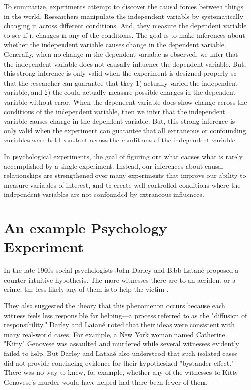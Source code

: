 To summarize, experiments attempt to discover the causal forces between things in the world. Researchers manipulate the independent variable by systematically changing it across different conditions. And, they measure the dependent variable to see if it changes in any of the conditions. The goal is to make inferences about whether the independent variable causes change in the dependent variable. Generally, when no change in the dependent variable is observed, we infer that the independent variable does not causally influence the dependent variable. But, this strong inference is only valid when the experiment is designed properly so that the researcher can guarantee that they 1) actually varied the independent variable, and 2) the could actually measure possible changes in the dependent variable without error. When the dependent variable does show change across the conditions of the independent variable, then we infer that the independent variable causes change in the dependent variable. But, this strong inference is only valid when the experiment can guarantee that all extraneous or confounding variables were held constant across the conditions of the independent variable.

In psychological experiments, the goal of figuring out what causes what is rarely accomplished by a single experiment. Instead, our inferences about causal relationships are strengthened over many experiments that improve our ability to measure variables of interest, and to create well-controlled conditions where the independent variables are not confounded by extraneous influences.

\section{An example Psychology Experiment}


In the late 1960s social psychologists John Darley and Bibb Latan\'e proposed a counter-intuitive hypothesis. The more witnesses there are to an accident or a crime, the less likely any of them is to help the victim \citep{darley_bystander_1968}.

They also suggested the theory that this phenomenon occurs because each witness feels less responsible for helping---a process referred to as the "diffusion of responsibility." Darley and Latan\'e noted that their ideas were consistent with many real-world cases. For example, a New York woman named Catherine "Kitty" Genovese was assaulted and murdered while several witnesses evidently failed to help. But Darley and Latan\'e also understood that such isolated cases did not provide convincing evidence for their hypothesized "bystander effect." There was no way to know, for example, whether any of the witnesses to Kitty Genovese's murder would have helped had there been fewer of them.


